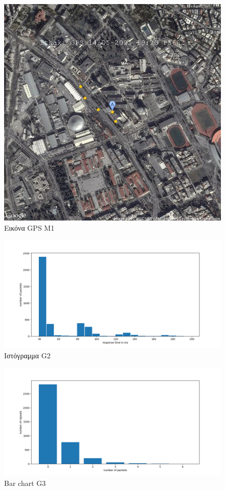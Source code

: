 \documentclass{article}
\begin{document}
\begin{figure}[H]
  \centering
  \includegraphics[width=\textwidth]{image_P3682T=225735403737T=225731403739T=225728403741T=225727403743.jpg}
  \caption{Εικόνα GPS Μ1}
  \label{fig:M1}
\end{figure}

\begin{figure}[H]
  \centering
  \includegraphics[width=\textwidth]{G2.png}
  \caption{Ιστόγραμμα G2}
  \label{fig:G2}
\end{figure}

\begin{figure}[H]
  \centering
  \includegraphics[width=\textwidth]{G3.png}
  \caption{Bar chart G3}
  \label{fig:G3}
\end{figure}
\end{document}
